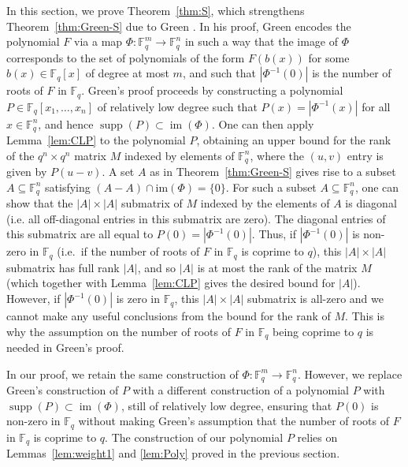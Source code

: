 \documentclass[11pt, reqno]{amsart}
\theoremstyle{definition}
\newcommand{\F}{\mathbb{F}}
\DeclareMathOperator{\supp}{supp}
\DeclareMathOperator{\im}{im}
\begin{document}
In this section, we prove Theorem~\ref{thm:S}, which strengthens Theorem~\ref{thm:Green-S} due to Green \cite{G17}. In his proof, Green encodes the polynomial $F$ via a map $\Phi \colon \F_q^m \to \F_q^n$ in such a way that the image of $\Phi$ corresponds to the set of polynomials of the form $F(b(x))$ for some $b(x)\in \F_q[x]$ of degree at most $m$, and such that $|\Phi^{-1}(0)|$ is the number of roots of $F$ in $\F_q$. Green's proof proceeds by constructing a polynomial $P\in \F_q[x_1,\dots,x_n]$ of relatively low degree such that $P(x) = |\Phi^{-1}(x)|$ for all $x\in \F_q^n$, and hence $\supp(P) \subset \im(\Phi)$. One can then apply Lemma~\ref{lem:CLP} to the polynomial $P$, obtaining an upper bound for the rank of the $q^n \times q^n$ matrix $M$ indexed by elements of $\F_q^n$, where the $(u,v)$ entry is given by $P(u-v)$. A set $A$ as in Theorem~\ref{thm:Green-S} gives rise to a subset $A\subseteq \F_q^n$ satisfying $(A-A) \cap \mathrm{im}(\Phi) = \{ 0 \}$. For such a subset $A\subseteq \F_q^n$, one can show that the $|A|\times |A|$ submatrix of $M$ indexed by the elements of $A$ is diagonal (i.e. all off-diagonal entries in this submatrix are zero). The diagonal entries of this submatrix are all equal to $P(0)=|\Phi^{-1}(0)|$. Thus, if $|\Phi^{-1}(0)|$ is non-zero in $\F_q$ (i.e.\ if the number of roots of $F$ in $\F_q$ is coprime to $q$), this $|A|\times |A|$ submatrix has full rank $|A|$, and so $|A|$ is at most the rank of the matrix $M$ (which together with Lemma~\ref{lem:CLP} gives the desired bound for $|A|$). However, if $|\Phi^{-1}(0)|$ is zero in $\F_q$, this $|A|\times |A|$ submatrix is all-zero and we cannot make any useful conclusions from the bound for the rank of $M$. This is why the assumption on the number of roots of $F$ in $\F_q$ being coprime to $q$ is needed in Green's proof.

In our proof, we retain the same construction of $\Phi\colon \F_q^m \to \F_q^n$. However, we replace Green's construction of $P$ with a different construction of a polynomial $P$ with $\supp(P) \subset \im(\Phi)$, still of relatively low degree, ensuring that $P(0)$ is non-zero in $\F_q$ without making Green's assumption that the number of roots of $F$ in $\F_q$ is coprime to $q$. The construction of our polynomial $P$ relies on Lemmas~\ref{lem:weight1} and \ref{lem:Poly} proved in the previous section.
\end{document}
